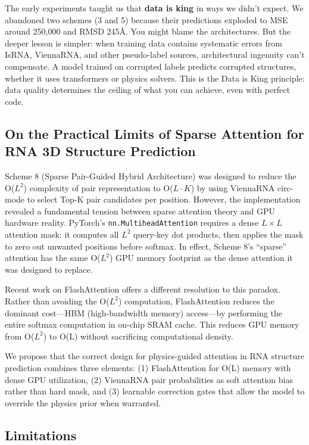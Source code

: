 \documentclass[12pt]{article}
\begin{document}
The early experiments taught us that \textbf{data is king} in ways we didn't expect. We abandoned two schemes (3 and 5) because their predictions exploded to MSE around 250,000 and RMSD 245\AA. You might blame the architectures. But the deeper lesson is simpler: when training data contains systematic errors from IsRNA, ViennaRNA, and other pseudo-label sources, architectural ingenuity can't compensate. A model trained on corrupted labels predicts corrupted structures, whether it uses transformers or physics solvers. This is the Data is King principle: data quality determines the ceiling of what you can achieve, even with perfect code.

\subsection{On the Practical Limits of Sparse Attention for RNA 3D Structure Prediction}

Scheme 8 (Sparse Pair-Guided Hybrid Architecture) was designed to reduce the O($L^2$) complexity of pair representation to O($L \cdot K$) by using ViennaRNA circ-mode to select Top-K pair candidates per position. However, the implementation revealed a fundamental tension between sparse attention theory and GPU hardware reality. PyTorch's \texttt{nn.MultiheadAttention} requires a dense $L \times L$ attention mask: it computes all $L^2$ query-key dot products, then applies the mask to zero out unwanted positions before softmax. In effect, Scheme 8's ``sparse'' attention has the same O($L^2$) GPU memory footprint as the dense attention it was designed to replace.

Recent work on FlashAttention \citep{dao2023} offers a different resolution to this paradox. Rather than avoiding the O($L^2$) computation, FlashAttention reduces the dominant cost---HBM (high-bandwidth memory) access---by performing the entire softmax computation in on-chip SRAM cache. This reduces GPU memory from O($L^2$) to O(L) without sacrificing computational density.

We propose that the correct design for physics-guided attention in RNA structure prediction combines three elements: (1) FlashAttention for O(L) memory with dense GPU utilization, (2) ViennaRNA pair probabilities as soft attention bias rather than hard mask, and (3) learnable correction gates that allow the model to override the physics prior when warranted.

\subsection{Limitations}
\end{document}
